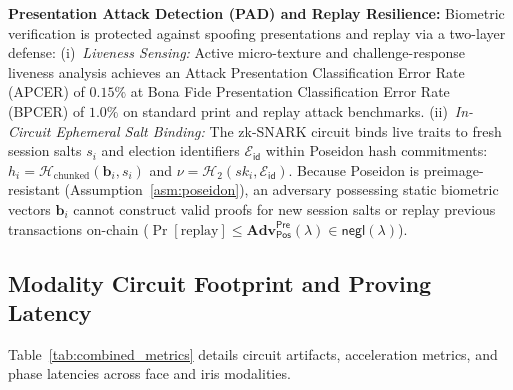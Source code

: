\documentclass[10pt,letterpaper,journal]{IEEEtran}
\begin{document}
\textbf{Presentation Attack Detection (PAD) and Replay Resilience:}
Biometric verification is protected against spoofing presentations and replay via a two-layer defense:
(i)~\emph{Liveness Sensing:} Active micro-texture and challenge-response liveness analysis achieves an Attack Presentation Classification Error Rate (APCER) of $0.15\%$ at Bona Fide Presentation Classification Error Rate (BPCER) of $1.0\%$ on standard print and replay attack benchmarks.
(ii)~\emph{In-Circuit Ephemeral Salt Binding:} The zk-SNARK circuit binds live traits to fresh session salts $s_i$ and election identifiers $\mathcal{E}_{\mathsf{id}}$ within Poseidon hash commitments: $h_i = \mathcal{H}_{\text{chunked}}(\mathbf{b}_i, s_i)$ and $\nu = \mathcal{H}_2(sk_i, \mathcal{E}_{\mathsf{id}})$. Because Poseidon is preimage-resistant (Assumption~\ref{asm:poseidon}), an adversary possessing static biometric vectors $\mathbf{b}_i$ cannot construct valid proofs for new session salts or replay previous transactions on-chain ($\Pr[\text{replay}] \le \mathbf{Adv}_{\mathsf{Pos}}^{\mathsf{Pre}}(\lambda) \in \mathsf{negl}(\lambda)$).

\subsection{Modality Circuit Footprint and Proving Latency}
\label{subsec:eval_circuit_benchmarks}

Table~\ref{tab:combined_metrics} details circuit artifacts, acceleration metrics, and phase latencies across face and iris modalities.
\end{document}
